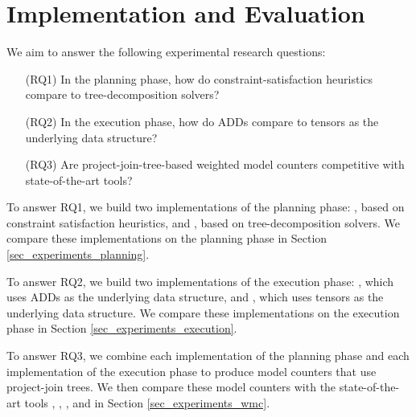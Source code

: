 \section{Implementation and Evaluation}
\label{sec_experiments}

We aim to answer the following experimental research questions:
\begin{itemize}
    \item[(RQ1)] In the planning phase, how do constraint-satisfaction heuristics compare to tree-decomposition solvers?
    \item[(RQ2)] In the execution phase, how do ADDs compare to tensors as the underlying data structure?
    \item[(RQ3)] Are project-join-tree-based weighted model counters competitive with state-of-the-art tools?
\end{itemize}

To answer RQ1, we build two implementations of the planning phase: \Htb{}, based on constraint satisfaction heuristics, and \Lg{}, based on tree-decomposition solvers.
We compare these implementations on the planning phase in Section \ref{sec_experiments_planning}.

To answer RQ2, we build two implementations of the execution phase: \Dmc{}, which uses ADDs as the underlying data structure, and \Tensor{}, which uses tensors as the underlying data structure.
We compare these implementations on the execution phase in Section \ref{sec_experiments_execution}.

To answer RQ3, we combine each implementation of the planning phase and each implementation of the execution phase to produce model counters that use project-join trees.
We then compare these model counters with the state-of-the-art tools \cachet{} \cite{sang2004combining}, \ctd{} \cite{darwiche2004new}, \df{} \cite{LM17}, and \minictd{} \cite{OD15} in Section \ref{sec_experiments_wmc}.

